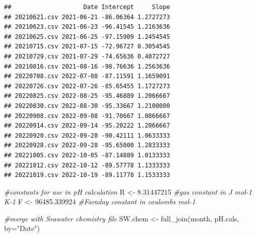 \documentclass[
]{article}
\newenvironment{Shaded}{\begin{snugshade}}{\end{snugshade}}
\newcommand{\AttributeTok}[1]{\textcolor[rgb]{0.77,0.63,0.00}{#1}}
\newcommand{\CommentTok}[1]{\textcolor[rgb]{0.56,0.35,0.01}{\textit{#1}}}
\newcommand{\FloatTok}[1]{\textcolor[rgb]{0.00,0.00,0.81}{#1}}
\newcommand{\FunctionTok}[1]{\textcolor[rgb]{0.00,0.00,0.00}{#1}}
\newcommand{\NormalTok}[1]{#1}
\newcommand{\OtherTok}[1]{\textcolor[rgb]{0.56,0.35,0.01}{#1}}
\newcommand{\StringTok}[1]{\textcolor[rgb]{0.31,0.60,0.02}{#1}}
\begin{document}
\begin{verbatim}
##                    Date Intercept     Slope
## 20210621.csv 2021-06-21 -86.06364 1.2727273
## 20210623.csv 2021-06-23 -96.41545 1.2163636
## 20210625.csv 2021-06-25 -97.15909 1.2454545
## 20210715.csv 2021-07-15 -72.96727 0.3054545
## 20210729.csv 2021-07-29 -74.65636 0.4072727
## 20210816.csv 2021-08-16 -98.76636 1.2563636
## 20220708.csv 2022-07-08 -87.11591 1.1659091
## 20220726.csv 2022-07-26 -85.65455 1.1727273
## 20220825.csv 2022-08-25 -95.46889 1.2066667
## 20220830.csv 2022-08-30 -95.33667 1.2100000
## 20220908.csv 2022-09-08 -91.70667 1.0866667
## 20220914.csv 2022-09-14 -95.20222 1.2066667
## 20220920.csv 2022-09-20 -90.42111 1.0633333
## 20220928.csv 2022-09-28 -95.65000 1.2833333
## 20221005.csv 2022-10-05 -87.14889 1.0133333
## 20221012.csv 2022-10-12 -89.57778 1.1333333
## 20221019.csv 2022-10-19 -89.11778 1.1533333
\end{verbatim}

\begin{Shaded}
\begin{Highlighting}[]
\CommentTok{\#constants for use in pH calculation }
\NormalTok{R }\OtherTok{\textless{}{-}} \FloatTok{8.31447215} \CommentTok{\#gas constant in J mol{-}1 K{-}1 }
\NormalTok{F }\OtherTok{\textless{}{-}} \FloatTok{96485.339924} \CommentTok{\#Faraday constant in coulombs mol{-}1}

\CommentTok{\#merge with Seawater chemistry file}
\NormalTok{SW.chem }\OtherTok{\textless{}{-}} \FunctionTok{full\_join}\NormalTok{(month, pH.cals, }\AttributeTok{by=}\StringTok{"Date"}\NormalTok{)}
\end{Highlighting}
\end{Shaded}
\end{document}
